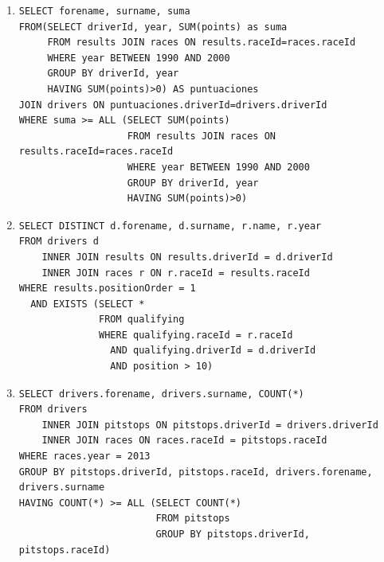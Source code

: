 \documentclass[a4paper]{article}
\begin{document}
\begin{enumerate}
    \item %
    \begin{verbatim}  
SELECT forename, surname, suma
FROM(SELECT driverId, year, SUM(points) as suma
     FROM results JOIN races ON results.raceId=races.raceId
     WHERE year BETWEEN 1990 AND 2000
     GROUP BY driverId, year
     HAVING SUM(points)>0) AS puntuaciones
JOIN drivers ON puntuaciones.driverId=drivers.driverId
WHERE suma >= ALL (SELECT SUM(points)
                   FROM results JOIN races ON results.raceId=races.raceId
                   WHERE year BETWEEN 1990 AND 2000
                   GROUP BY driverId, year
                   HAVING SUM(points)>0)

    \end{verbatim}
    
    \item %
    \begin{verbatim}  
SELECT DISTINCT d.forename, d.surname, r.name, r.year
FROM drivers d
	INNER JOIN results ON results.driverId = d.driverId
    INNER JOIN races r ON r.raceId = results.raceId
WHERE results.positionOrder = 1
  AND EXISTS (SELECT *
              FROM qualifying
              WHERE qualifying.raceId = r.raceId
                AND qualifying.driverId = d.driverId
                AND position > 10)
    \end{verbatim}
            
            
    \item %
    \begin{verbatim}  
SELECT drivers.forename, drivers.surname, COUNT(*)
FROM drivers
	INNER JOIN pitstops ON pitstops.driverId = drivers.driverId
    INNER JOIN races ON races.raceId = pitstops.raceId
WHERE races.year = 2013
GROUP BY pitstops.driverId, pitstops.raceId, drivers.forename, drivers.surname
HAVING COUNT(*) >= ALL (SELECT COUNT(*)
                        FROM pitstops
                       	GROUP BY pitstops.driverId, pitstops.raceId)  
    \end{verbatim}
            

\end{enumerate}
\end{document}
